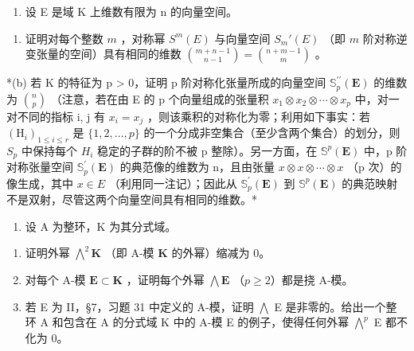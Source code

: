 \begin{enumerate}
\def\labelenumi{\arabic{enumi}.}
\setcounter{enumi}{4}
\tightlist
\item
  设 E 是域 K 上维数有限为 n 的向量空间。
\end{enumerate}

\begin{enumerate}
\def\labelenumi{(\alph{enumi})}
\tightlist
\item
  证明对每个整数 \(m\) ，对称幂 \(S^m(E)\) 与向量空间 \(S_m'(E)\) （即 \(m\) 阶对称逆变张量的空间）具有相同的维数 \(\binom{m + n - 1}{n - 1} = \binom{n + m - 1}{m}\) 。
\end{enumerate}

*(b) 若 K 的特征为 p \textgreater{} 0，证明 p 阶对称化张量所成的向量空间 \(\mathbb{S}_{p}^{\prime\prime}(\mathbf{E})\) 的维数为 \(\binom{n}{p}\) （注意，若在由 E 的 p 个向量组成的张量积 \(x_{1} \otimes x_{2} \otimes \cdots \otimes x_{p}\) 中，对一对不同的指标 i, j 有 \(x_{i} = x_{j}\) ，则该乘积的对称化为零；利用如下事实：若 \((\mathrm{H}_{i})_{1 \leqslant i \leqslant r}\) 是 \(\{1, 2, \ldots, p\}\) 的一个分成非空集合（至少含两个集合）的划分，则 \(S_{p}\) 中保持每个 \(H_{i}\) 稳定的子群的阶不被 p 整除）。另一方面，在 \(\mathbb{S}^{p}(\mathbf{E})\) 中，p 阶对称张量空间 \(\mathbb{S}_{p}^{\prime}(\mathbf{E})\) 的典范像的维数为 n，且由张量 \(x \otimes x \otimes \cdots \otimes x\) （p 次）的像生成，其中 \(x \in E\) （利用同一注记）；因此从 \(\mathbb{S}_{p}^{\prime}(\mathbf{E})\) 到 \(\mathbb{S}^{p}(\mathbf{E})\) 的典范映射不是双射，尽管这两个向量空间具有相同的维数。*

\BourbakiExercisesSection

\begin{enumerate}
\def\labelenumi{\arabic{enumi}.}
\tightlist
\item
  设 A 为整环，K 为其分式域。
\end{enumerate}

\begin{enumerate}
\def\labelenumi{(\alph{enumi})}
\item
  证明外幂 \(\bigwedge^{2}\mathbf{K}\) （即 A-模 \(\mathbf{K}\) 的外幂）缩减为 0。
\item
  对每个 A-模 \(\mathbf{E} \subset \mathbf{K}\) ，证明每个外幂 \(\bigwedge \mathbf{E}\) （\(p \geqslant 2\)）都是挠 A-模。
\item
  若 E 为 II，§7，习题 31 中定义的 A-模，证明 \(\bigwedge\) E 是非零的。给出一个整环 A 和包含在 A 的分式域 K 中的 A-模 E 的例子，使得任何外幂 \(\bigwedge^{p}\) E 都不化为 0。
\end{enumerate}

